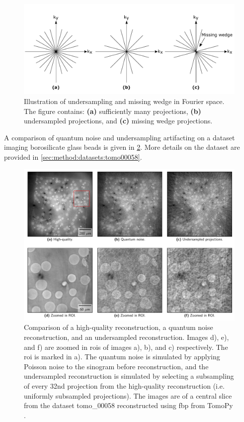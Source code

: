 \begin{figure}[htbp]  
    \centering
    \includegraphics[width=.8\textwidth]{figures/undersampling.pdf}
    \caption[Illustration of undersampling and missing wedge in Fourier space]{Illustration of undersampling and missing wedge in Fourier space. The figure contains: \textbf{(a)} sufficiently many projections, \textbf{(b)} undersampled projections, and \textbf{(c)} missing wedge projections. }
    \label{fig:undersampling}
\end{figure}

A comparison of quantum noise and undersampling artifacting on a dataset imaging borosilicate glass beads is given in \cref{fig:noisecomparison}. More details on the dataset are provided in \cref{sec:method:datasets:tomo00058}. 

\begin{figure}[htbp]  
    \centering
    \includegraphics[width=.9\textwidth]{figures/noisecomparison.pdf}
    \caption[Illustration of reconstruction noise and artifacting]{Comparison of a high-quality reconstruction, a quantum noise reconstruction, and an undersampled reconstruction. Images d), e), and f) are zoomed in \glspl{roi} of images a), b), and c) respectively. The \gls{roi} is marked in a). The quantum noise is simulated by applying Poisson noise to the sinogram before reconstruction, and the undersampled reconstruction is simulated by selecting a subsampling of every 32nd projection from the high-quality reconstruction (i.e. uniformly subsampled projections). The images are of a central slice from the dataset tomo\_00058 \cite{datasetglassspheres} reconstructed using \gls{fbp} from TomoPy \cite{TomoBank}. }
    \label{fig:noisecomparison}
\end{figure}

